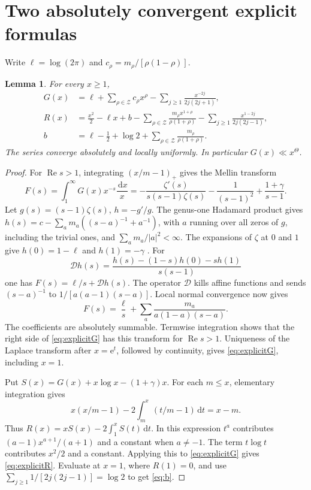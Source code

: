 \documentclass[11pt,a4paper]{article}
\newtheorem{lemma}[theorem]{Lemma}
\newcommand{\Znt}{\mathcal Z}
\newcommand{\dd}{\,\mathrm d}
\newcommand{\ee}{\mathrm e}
\newcommand{\Rea}{\operatorname{Re}}
\begin{document}
\section{Two absolutely convergent explicit formulas}\label{sec:explicit}
Write $\ell=\log(2\pi)$ and $c_\rho=m_\rho/[\rho(1-\rho)]$.
\begin{lemma}\label{lem:explicit}
For every $x\ge1$,
\begin{align}
 G(x)&=\ell+\sum_{\rho\in\Znt}c_\rho x^\rho
              -\sum_{j\ge1}\frac{x^{-2j}}{2j(2j+1)},\label{eq:explicitG}\\
 R(x)&=\frac{x^2}{2}-\ell x+b
   -\sum_{\rho\in\Znt}\frac{m_\rho x^{1+\rho}}{\rho(1+\rho)}
   -\sum_{j\ge1}\frac{x^{1-2j}}{2j(2j-1)},\label{eq:explicitR}\\
 b&=\ell-\tfrac12+\log2+\sum_{\rho\in\Znt}\frac{m_\rho}{\rho(1+\rho)}.\label{eq:b}
\end{align}
The series converge absolutely and locally uniformly. In particular $G(x)\ll x^\Theta$.
\end{lemma}
\begin{proof}
For $\Rea s>1$, integrating $(x/m-1)_+$ gives the Mellin transform
\[
 F(s)=\int_1^\infty G(x)x^{-s}\frac{\dd x}{x}
 =-\frac{\zeta'(s)}{s(s-1)\zeta(s)}-\frac1{(s-1)^2}
          +\frac{1+\gamma}{s-1}.
\]
Let $g(s)=(s-1)\zeta(s)$, $h=-g'/g$. The genus-one Hadamard product \cite{garrett} gives $h(s)=c-\sum_a m_a((s-a)^{-1}+a^{-1})$, with $a$ running over all zeros of $g$, including the trivial ones, and $\sum_a m_a/|a|^2<\infty$. The expansions of $\zeta$ at $0$ and $1$ give $h(0)=1-\ell$ and $h(1)=-\gamma$ \cite{dlmf}. For
\[
 \mathcal{D}h(s)=\frac{h(s)-(1-s)h(0)-sh(1)}{s(s-1)}
\]
one has $F(s)=\ell/s+\mathcal{D}h(s)$. The operator $\mathcal{D}$ kills affine functions and sends $(s-a)^{-1}$ to $1/[a(a-1)(s-a)]$. Local normal convergence now gives
\[
 F(s)=\frac{\ell}{s}+\sum_a\frac{m_a}{a(1-a)(s-a)}.
\]
The coefficients are absolutely summable. Termwise integration shows that the right side of \eqref{eq:explicitG} has this transform for $\Rea s>1$. Uniqueness of the Laplace transform after $x=\ee^t$, followed by continuity, gives \eqref{eq:explicitG}, including $x=1$.

Put $S(x)=G(x)+x\log x-(1+\gamma)x$. For each $m\le x$, elementary integration gives
\[
 x(x/m-1)-2\int_m^x(t/m-1)\dd t=x-m.
\]
Thus $R(x)=xS(x)-2\int_1^x S(t)\dd t$. In this expression $t^a$ contributes $(a-1)x^{a+1}/(a+1)$ and a constant when $a\ne-1$. The term $t\log t$ contributes $x^2/2$ and a constant. Applying this to \eqref{eq:explicitG} gives \eqref{eq:explicitR}. Evaluate at $x=1$, where $R(1)=0$, and use $\sum_{j\ge1}1/[2j(2j-1)]=\log2$ to get \eqref{eq:b}.
\end{proof}
\end{document}

